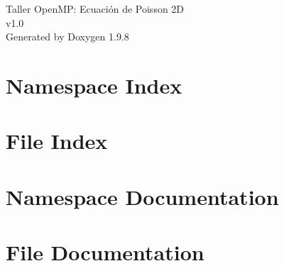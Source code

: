 \documentclass[twoside]{book}
\newcommand{\+}{\discretionary{\mbox{\scriptsize$\hookleftarrow$}}{}{}}
\newcommand{\clearemptydoublepage}{%
    \newpage{\pagestyle{empty}\cleardoublepage}%
  }
\begin{document}
  \raggedbottom
    \hypersetup{pageanchor=false,
                bookmarksnumbered=true,
                pdfencoding=unicode
               }
  \begin{titlepage}
  \vspace*{7cm}
  \begin{center}%
  {\Large Taller Open\+MP\+: Ecuación de Poisson 2D}\\
  [1ex]\large v1.\+0 \\
  \vspace*{1cm}
  {\large Generated by Doxygen 1.9.8}\\
  \end{center}
  \end{titlepage}
  \clearemptydoublepage
  \tableofcontents
  \clearemptydoublepage
  \hypersetup{pageanchor=true}
\chapter{Namespace Index}

\chapter{File Index}

\chapter{Namespace Documentation}

\chapter{File Documentation}
















  \backmatter
  \newpage
  \clearemptydoublepage
  \printindex
\end{document}
